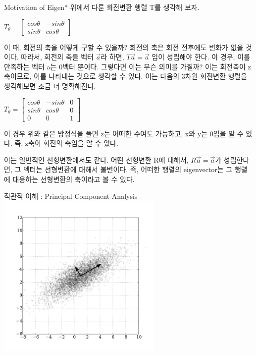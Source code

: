 \documentclass{beamer}
\begin{document}
\begin{frame}[allowframebreaks]{Motivation of Eigen*}
위에서 다룬 회전변환 행렬 T를 생각해 보자. 


$T_{\theta} = 
\left[ \begin{matrix}
cos \theta & - sin \theta  \\
sin \theta & cos \theta 
\end{matrix} \right] $

이 때, 회전의 축을 어떻게 구할 수 있을까? 회전의 축은 회전 전후에도 변화가 없을 것이다. 따라서, 회전의 축을 벡터 $\vec{a}$라 하면, $T\vec{a} = \vec{a}$ 임이 성립해야 한다. 이 경우, 이를 만족하는 벡터 a는 0벡터 뿐이다. 그렇다면 이는 무슨 의미를 가질까? 이는 회전축이 z축이므로, 이를 나타내는 것으로 생각할 수 있다. 이는 다음의 3차원 회전변환 행렬을 생각해보면 조금 더 명확해진다. 

$T_{\theta} = 
\left[ \begin{matrix}
cos \theta & - sin \theta & 0 \\
sin \theta & cos \theta & 0 \\ 
0&0&1
\end{matrix} \right] $

이 경우 위와 같은 방정식을 풀면 z는 어떠한 수여도 가능하고, x와 y는 0임을 알 수 있다. 즉, z축이 회전의 축임을 알 수 있다. 

이는 일반적인 선형변환에서도 같다. 어떤 선형변환 R에 대해서, $R\vec{a} = \vec{a}$가 성립한다면, 그 벡터는 선형변환에 대해서 불변이다. 즉, 어떠한 행렬의 eigenvector는 그 행렬에 대응하는 선형변환의 축이라고 볼 수 있다. 


\end{frame}

\begin{frame}{직관적 이해 : Principal Component Analysis} 
\includegraphics[height=8cm,keepaspectratio]{pca}
\end{frame}
\end{document}
